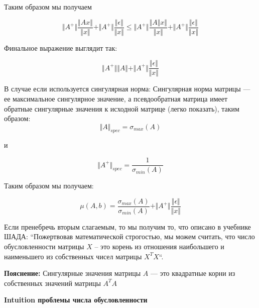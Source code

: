 \documentclass{article}
\begin{document}
    Таким образом мы получаем

    \begin{equation}
        \Vert A^{+} \Vert \frac{\Vert Ax \Vert} {\Vert x \Vert}  + \Vert A^{+} \Vert \frac{ \Vert \epsilon \Vert }{\Vert x \Vert} \leq \Vert A^{+} \Vert \frac{\Vert A \Vert x \Vert} {\Vert x \Vert}  + \Vert A^{+} \Vert \frac{ \Vert \epsilon \Vert }{\Vert x \Vert}
    \end{equation}

    Финальное выражение выглядит так:

    \begin{equation}
        \Vert A^{+} \Vert \Vert A \Vert   + \Vert A^{+} \Vert \frac{ \Vert \epsilon \Vert }{\Vert x \Vert}
    \end{equation}

    В случае если используется сингулярная норма: Сингулярная норма матрицы --- ее максимальное сингулярное значение,
    а псевдообратная матрица имеет обратные сингулярные значения к исходной матрице (легко показать),
    таким образом:
    \begin{equation}
        \Vert A \Vert_{spec} = \sigma_{max}(A)
    \end{equation}

    и

    \begin{equation}
        \Vert A^{+} \Vert_{spec} = \frac{1}{\sigma_{min}(A)}
    \end{equation}

    Таким образом мы получаем:

    \begin{equation}
        \mu(A, b) = \frac{\sigma_{max}(A)}{\sigma_{min}(A)} + \Vert A^{+} \Vert \frac{ \Vert \epsilon \Vert }{\Vert x \Vert}
    \end{equation}

    Если пренебречь вторым слагаемым, то мы получим то, что описано в учебнике ШАДА: 
    ``Пожертвовав математической строгостью, мы можем считать, что число обусловленности матрицы $X$ – 
    это корень из отношения наибольшего и наименьшего из собственных чисел матрицы $X^{T}X$``.
    \quad

    \textbf{Пояснение:}
    Сингулярные значения матрицы $A$ --- это квадратные корни из собственных значений матрицы $A^{T}A$

    \quad

    \textbf{Intuition проблемы числа обусловленности}

    \quad
\end{document}
